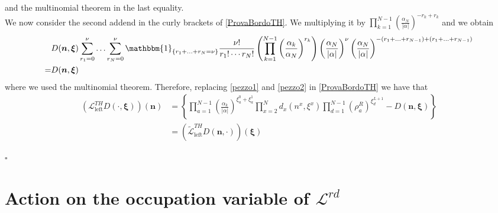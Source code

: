 \documentclass[10pt]{article}
\numberwithin{equation}{section}
\numberwithin{equation}{subsection}
\begin{document}
and the multinomial theorem in the last equality. \\ We now consider the second addend in the curly brackets of \eqref{ProvaBordoTH}.
We multiplying it by $\prod_{k=1}^{N-1}\left(\frac{\alpha_{N}}{|\alpha|}\right)^{-r_{k}+r_{k}}$ and we obtain
\begin{equation}\label{pezzo2}
	\begin{split}
		&D(\bm{n},\bm{\xi})\sum_{r_{1}=0}^{\nu}\ldots\sum_{r_{N}=0}^{\nu}\mathbbm{1}_{\{r_{1}+\ldots+r_{N}=\nu\}}\frac{\nu!}{r_{1}!\cdots r_{N}!}\left(\prod_{k=1}^{N-1}\left(\frac{\alpha_{k}}{\alpha_{N}}\right)^{r_{k}}\right)\left(\frac{\alpha_{N}}{|\alpha|}\right)^{\nu}\left(\frac{\alpha_{N}}{|\alpha|}\right)^{-(r_{1}+\ldots+r_{N-1})+(r_{1}+\ldots+r_{N-1})}\\=&D(\bm{n},\bm{\xi})
	\end{split}
\end{equation}
where we used the multinomial theorem. Therefore, replacing \eqref{pezzo1} and \eqref{pezzo2} in \eqref{ProvaBordoTH} we have that
\begin{align}
	\left(\mathcal{L}_{\text{left}}^{TH}D(\cdot,\bm{\xi})\right)(\bm{n})&=\left\{\prod_{a=1}^{N-1}\left(\frac{\alpha_{k}}{|\alpha|}\right)^{\xi_{a}^{0}+\xi_{a}^{1}}\prod_{x=2}^{N}d_{x}(n^{x},\xi^{x})\prod_{d=1}^{N-1}(\rho_{a}^{R})^{\xi_{d}^{L+1}}-D(\bm{n},\bm{\xi})\right\}
	\\&=
	\left(\widetilde{\mathcal{L}}_{\text{left}}^{TH}D(\bm{n},\cdot)\right)(\bm{\xi})
\end{align}
\begin{flushright}
	$\square$
\end{flushright}
\section{Action on the occupation variable of $\mathcal{L}^{rd}$}\label{appendix-RD}
\end{document}
